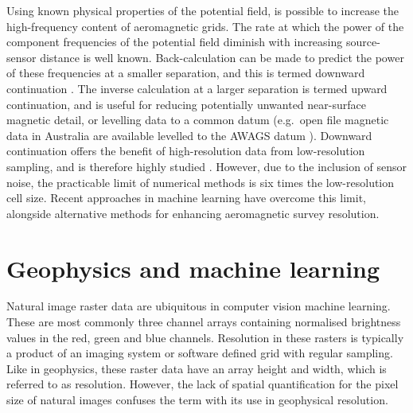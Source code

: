 Using known physical properties of the potential field, is possible to increase the high-frequency content of aeromagnetic grids.
The rate at which the power of the component frequencies of the potential field diminish with increasing source-sensor distance is well known.
Back-calculation can be made to predict the power of these frequencies at a smaller separation, and this is termed downward continuation \parencite{bullardDeterminationMassesNecessary1948,blakelyPotentialTheoryGravity1996}.
The inverse calculation at a larger separation is termed upward continuation, and is useful for reducing potentially unwanted near-surface magnetic detail, or levelling data to a common datum (e.g.\ open file magnetic data in Australia are available levelled to the AWAGS datum \parencite{mintyAirborneGeophysicalMapping2011}).
Downward continuation offers the benefit of high-resolution data from low-resolution sampling, and is therefore highly studied \parencite{zuoDownwardContinuationTransformation2020,fediStableDownwardContinuation2002,zhangNumericalSolutionsMeanValue2018,guoPotentialFieldContinuation2020,gangImprovedStableDownward2018,pilkingtonPotentialFieldContinuation2017}.
However, due to the inclusion of sensor noise, the practicable limit of numerical methods is six times the low-resolution cell size.
Recent approaches in machine learning have overcome this limit, alongside alternative methods for enhancing aeromagnetic survey resolution.

\section{Geophysics and machine learning}
\label{sec:introdata}
Natural image raster data are ubiquitous in computer vision machine learning.
These are most commonly three channel arrays containing normalised brightness values in the red, green and blue channels.
Resolution in these rasters is typically a product of an imaging system or software defined grid with regular sampling.
Like in geophysics, these raster data have an array height and width, which is referred to as resolution.
However, the lack of spatial quantification for the pixel size of natural images confuses the term with its use in geophysical resolution.


